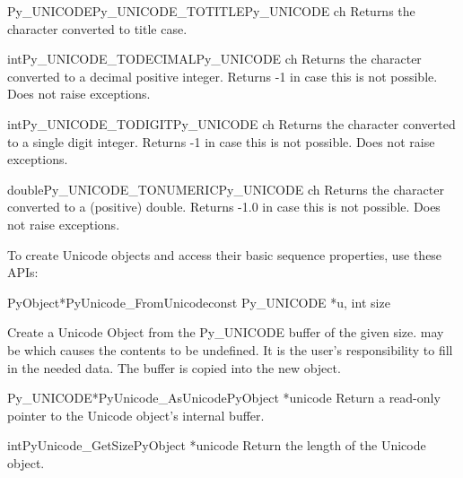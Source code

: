 \documentclass{manual}
\begin{document}
\begin{cfuncdesc}{Py_UNICODE}{Py_UNICODE_TOTITLE}{Py_UNICODE ch}
Returns the character  converted to title case.
\end{cfuncdesc}

\begin{cfuncdesc}{int}{Py_UNICODE_TODECIMAL}{Py_UNICODE ch}
Returns the character  converted to a decimal positive integer.
Returns -1 in case this is not possible. Does not raise exceptions.
\end{cfuncdesc}

\begin{cfuncdesc}{int}{Py_UNICODE_TODIGIT}{Py_UNICODE ch}
Returns the character  converted to a single digit integer.
Returns -1 in case this is not possible. Does not raise exceptions.
\end{cfuncdesc}

\begin{cfuncdesc}{double}{Py_UNICODE_TONUMERIC}{Py_UNICODE ch}
Returns the character  converted to a (positive) double.
Returns -1.0 in case this is not possible. Does not raise exceptions.
\end{cfuncdesc}


To create Unicode objects and access their basic sequence properties,
use these APIs:

\begin{cfuncdesc}{PyObject*}{PyUnicode_FromUnicode}{const Py_UNICODE *u,
                                                    int size} 

Create a Unicode Object from the Py_UNICODE buffer  of the
given size.  may be \NULL{} which causes the contents to be
undefined. It is the user's responsibility to fill in the needed data.
The buffer is copied into the new object.
\end{cfuncdesc}

\begin{cfuncdesc}{Py_UNICODE*}{PyUnicode_AsUnicode}{PyObject *unicode}
Return a read-only pointer to the Unicode object's internal
 buffer.
\end{cfuncdesc}

\begin{cfuncdesc}{int}{PyUnicode_GetSize}{PyObject *unicode}
Return the length of the Unicode object.
\end{cfuncdesc}
\end{document}

